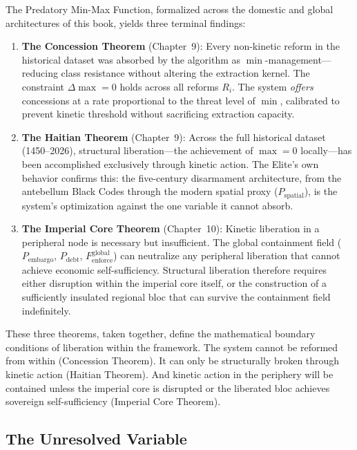 \documentclass[12pt,openany]{book}
\begin{document}
The Predatory Min-Max Function, formalized across the domestic and global architectures of this book, yields three terminal findings:

\begin{enumerate}
    \item \textbf{The Concession Theorem} (Chapter~9): Every non-kinetic reform in the historical dataset was absorbed by the algorithm as $\min$-management---reducing class resistance without altering the extraction kernel. The constraint $\Delta\max = 0$ holds across all reforms $R_i$. The system \textit{offers} concessions at a rate proportional to the threat level of $\min$, calibrated to prevent kinetic threshold without sacrificing extraction capacity.

    \item \textbf{The Haitian Theorem} (Chapter~9): Across the full historical dataset (1450--2026), structural liberation---the achievement of $\max = 0$ locally---has been accomplished exclusively through kinetic action. The Elite's own behavior confirms this: the five-century disarmament architecture, from the antebellum Black Codes through the modern spatial proxy ($P_{\text{spatial}}$), is the system's optimization against the one variable it cannot absorb.

    \item \textbf{The Imperial Core Theorem} (Chapter~10): Kinetic liberation in a peripheral node is necessary but insufficient. The global containment field ($P_{\text{embargo}}$, $P_{\text{debt}}$, $F_{\text{enforce}}^{\text{global}}$) can neutralize any peripheral liberation that cannot achieve economic self-sufficiency. Structural liberation therefore requires either disruption within the imperial core itself, or the construction of a sufficiently insulated regional bloc that can survive the containment field indefinitely.
\end{enumerate}

These three theorems, taken together, define the mathematical boundary conditions of liberation within the framework. The system cannot be reformed from within (Concession Theorem). It can only be structurally broken through kinetic action (Haitian Theorem). And kinetic action in the periphery will be contained unless the imperial core is disrupted or the liberated bloc achieves sovereign self-sufficiency (Imperial Core Theorem).

\subsection*{The Unresolved Variable}
\end{document}
